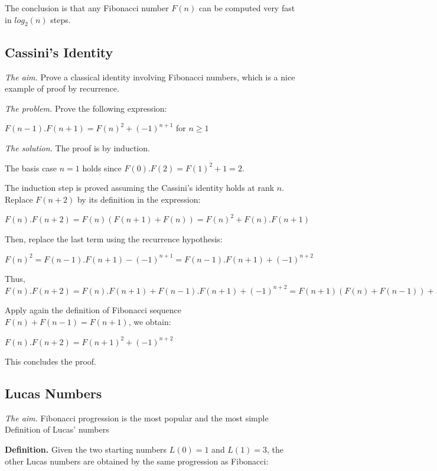 The conclusion is that
any Fibonacci number $F(n)$ can be computed very fast in $log_2 (n)$ steps.



\subsection{Cassini's Identity}

\noindent \textit{The aim.}
Prove a classical identity involving Fibonacci numbers, which is a nice example of proof by recurrence.
\medskip

\noindent \textit{The problem.}
Prove the following expression:

$F(n-1).F(n+1) = F(n)^2 + (-1)^{n+1}$ for $n \geq 1$
\medskip

%
%
%
%
%

\noindent \textit{The solution.}
The proof is by induction.

The basis case $n=1$ holds since $F(0).F(2) = F(1)^2 +1 = 2$.

The induction step is proved assuming the Cassini's identity holds at rank $n$.
Replace $F(n+2)$ by its definition in the expression:
 
$F(n).F(n+2) = F(n) (F(n+1)+F(n)) = F(n)^2 + F(n).F(n+1)$

Then, replace the last term using the recurrence hypothesis:

$F(n)^2 = F(n-1).F(n+1) - (-1)^{n+1} =F(n-1).F(n+1) + (-1)^{n+2} $

Thus,
$F(n).F(n+2) = F(n).F(n+1) + F(n-1).F(n+1) + (-1)^{n+2} = F(n+1) (F(n) + F(n-1)) + (-1)^{n+2}$ 

Apply again the definition of Fibonacci sequence $F(n) + F(n-1) = F(n+1)$, we obtain:

$F(n).F(n+2) = F(n+1)^2 + (-1)^{n+2}$

This concludes the proof. 


\subsection{Lucas Numbers} 

\noindent \textit{The aim.}
Fibonacci progression is the most popular and the most simple Definition of Lucas' numbers

\textbf{Definition.}
Given the two starting numbers $L(0) = 1$ and $L(1) = 3$, 
the other Lucas numbers are obtained by the same progression as Fibonacci: 

